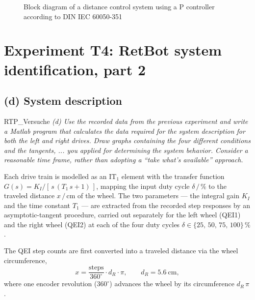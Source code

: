 \documentclass[12pt, oneside, a4paper]{scrreprt}
\begin{document}
\begin{figure}[H]
\begin{tikzpicture}
                \end{tikzpicture}
                \caption{Block diagram of a distance control system using a P controller according to DIN IEC 60050-351}
                \label{fig:distance_control_block_diagram}
            \end{figure}


    \chapter{Experiment T4: RetBot system identification, part 2}\label{ch:ExperimentT4}
        \section{(d) System description}\label{sec:d-system-description}

            \begin{displaycquote}{RTP_Versuche}
                \footnotesize{\textit{(d) Use the recorded data from the previous experiment and write a Matlab program that calculates the data required for the system description for both the left and right drives. Draw graphs containing the four different conditions and the tangents, ... you applied for determining the system behavior. Consider a reasonable time frame, rather than adopting a ``take what's available'' approach.}} 
            \end{displaycquote}\label{task(d)}

            Each drive train is modelled as an IT$_1$ element with the transfer function $G(s) = K_I / [\,s\,(T_1\,s + 1)\,]$, mapping the input duty cycle $\delta\,/\,\%$ to the traveled distance $x\,/\,\mathrm{cm}$ of the wheel. The two parameters --- the integral gain $K_I$ and the time constant $T_1$ --- are extracted from the recorded step responses by an asymptotic-tangent procedure, carried out separately for the left wheel (QEI1) and the right wheel (QEI2) at each of the four duty cycles $\delta \in \{25,\,50,\,75,\,100\}\,\%$.

            The QEI step counts are first converted into a traveled distance via the wheel circumference,
            \begin{equation}
                x = \frac{\text{steps}}{360^\circ} \cdot d_R \cdot \pi, \qquad d_R = \SI{5.6}{\cm},
                \label{eq:weg_aus_winkel}
            \end{equation}
            where one encoder revolution ($360^\circ$) advances the wheel by its circumference $d_R\,\pi$.
\end{document}
